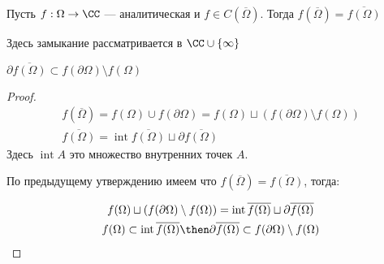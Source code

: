 \begin{claim}
    Пусть $f: \Omega \to \CC$ --- аналитическая и $f \in C(\overline{\Omega})$. Тогда $f(\overline{\Omega}) = \overline{f(\Omega)}$

    Здесь замыкание рассматривается в $\CC \cup \{\infty\}$
\end{claim}

\begin{crly}
    $\partial \overline{f(\Omega)} \subset f(\partial \Omega) \setminus f(\Omega)$
\end{crly}
\begin{proof}
    \begin{gather*} 
		f(\overline{\Omega}) = f(\Omega) \cup f(\partial \Omega) = f(\Omega) \sqcup \left( f(\partial \Omega) \setminus f(\Omega) \right) \\
        \overline{f(\Omega)} = \operatorname*{int} \overline{f(\Omega)} \sqcup \partial \overline{f(\Omega)}
    \end{gather*}
	Здесь $\operatorname*{int}A$ это множество внутренних точек $A$.

	По предыдущему утверждению имеем что $f(\overline{\Omega}) = \overline{f(\Omega)}$, тогда:

	\begin{gather*}
		f(\Omega) \sqcup \left( f(\partial \Omega) \setminus f(\Omega) \right) = \operatorname*{int} \overline{f(\Omega)} \sqcup \partial \overline{f(\Omega)}\\ 
        f(\Omega) \subset \operatorname{int}\overline{f(\Omega)} \then \partial \overline{f(\Omega)} \subset f(\partial \Omega) \setminus f(\Omega)
	\end{gather*}
\end{proof}

